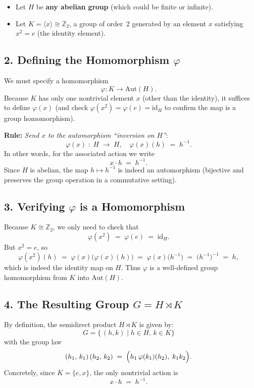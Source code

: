 \documentclass[12pt]{article}
\theoremstyle{definition} %
\theoremstyle{plain} %
\begin{document}
\begin{itemize}
\item Let $H$ be \textbf{any abelian group} (which could be finite or infinite).
\item Let $K = \langle x \rangle \cong \mathbb{Z}_2$, a group of order~2 generated by an element $x$ 
      satisfying $x^2 = e$ (the identity element).
\end{itemize}

\subsection*{2. Defining the Homomorphism \boldmath$\varphi$}

We must specify a homomorphism 
\[
  \varphi : K \to \mathrm{Aut}(H).
\]
Because $K$ has only one nontrivial element $x$ (other than the identity), 
it suffices to define $\varphi(x)$ (and check $\varphi(x^2) = \varphi(e) = \mathrm{id}_H$ 
to confirm the map is a group homomorphism).

\smallskip
\noindent
\textbf{Rule:} \emph{Send $x$ to the automorphism ``inversion on $H$''}:
\[
  \varphi(x) \;:\; H \;\longrightarrow\; H, 
  \quad
  \varphi(x)(h) \;=\; h^{-1}.
\]
In other words, for the associated action we write
\[
  x \cdot h \;=\; h^{-1}.
\]
Since $H$ is abelian, the map $h \mapsto h^{-1}$ is indeed an automorphism (bijective and preserves the group operation in a commutative setting).

\subsection*{3. Verifying \boldmath$\varphi$ is a Homomorphism}

Because $K \cong \mathbb{Z}_2$, we only need to check that
\[
  \varphi(x^2) \;=\; \varphi(e) \;=\; \mathrm{id}_H.
\]
But $x^2 = e$, so 
\[
  \varphi(x^2)(h) 
  \;=\; \varphi(x)\bigl(\varphi(x)(h)\bigr) 
  \;=\; \varphi(x)\bigl(h^{-1}\bigr)
  \;=\; \bigl(h^{-1}\bigr)^{-1}
  \;=\; h,
\]
which is indeed the identity map on $H$. Thus $\varphi$ is a well-defined group homomorphism from $K$ into $\mathrm{Aut}(H)$.

\subsection*{4. The Resulting Group \boldmath$G = H \rtimes K$}

By definition, the semidirect product $H \rtimes K$ is given by:
\[
  G = \bigl\{\,(h,k) \mid h \in H,\, k \in K \bigr\}
\]
with the group law
\[
  (h_1,\,k_1)\,(h_2,\,k_2) 
  \;=\;
  \Bigl( h_1 \,\varphi(k_1)(h_2),\; k_1 k_2\Bigr).
\]
Concretely, since $K=\{e,x\}$, the only nontrivial action is 
\[
  x \cdot h \;=\; h^{-1}.
\]
\end{document}
